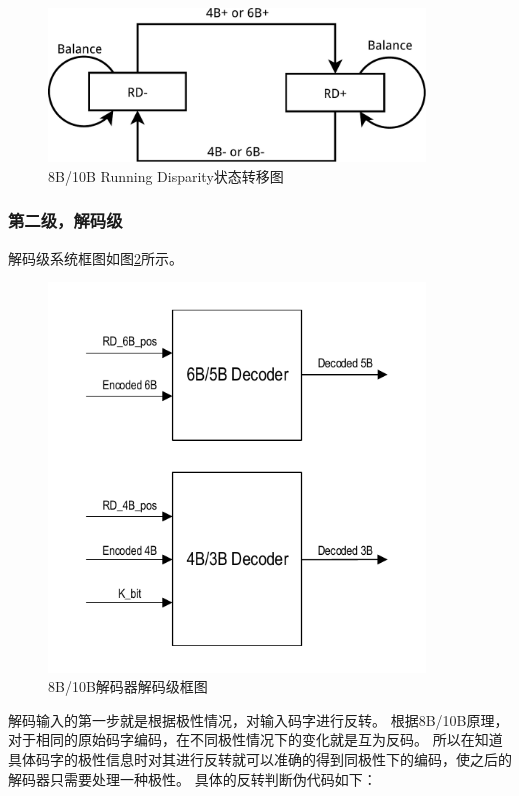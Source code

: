\documentclass[UTF8]{ctexart}
\begin{document}
\begin{figure}[H]
\centering
\includegraphics[width=10cm]{./img/8b10b_running_disparity_status.pdf}
\caption{8B/10B Running Disparity状态转移图}
\label{fig:8b10b_running_disparity_status}
\end{figure}

\subsubsection{第二级，解码级}

解码级系统框图如图\ref{fig:8b10b_decoder_model}所示。

\begin{figure}[H]
\centering
\includegraphics[width=10cm]{./img/8b10b_decoder_model.pdf}
\caption{8B/10B解码器解码级框图}
\label{fig:8b10b_decoder_model}
\end{figure}

解码输入的第一步就是根据极性情况，对输入码字进行反转。
根据8B/10B原理，对于相同的原始码字编码，在不同极性情况下的变化就是互为反码。
所以在知道具体码字的极性信息时对其进行反转就可以准确的得到同极性下的编码，使之后的解码器只需要处理一种极性。
具体的反转判断伪代码如下：
\end{document}
